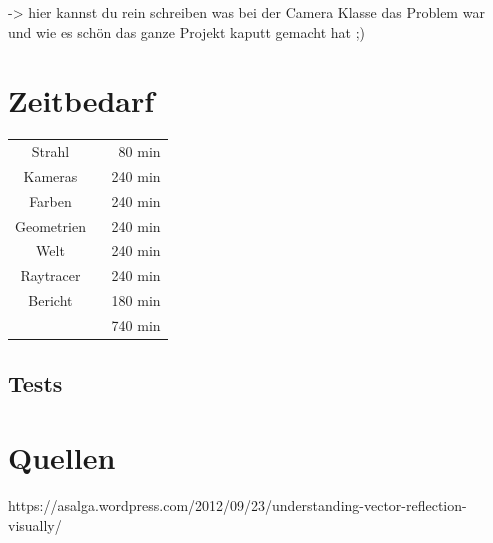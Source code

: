 \documentclass[14pt]{extarticle}
\begin{document}
-> hier kannst du rein schreiben was bei der Camera Klasse das Problem war und wie es schön das ganze Projekt kaputt gemacht hat ;) 



\section{Zeitbedarf}
\begin{center}
\begin{tabular}{cr}
Strahl	  \	&80 min	\\
Kameras 	\	&240 min	\\
Farben \	&240 min	\\
Geometrien \	&240 min	\\
Welt \	&240 min	\\
Raytracer \	&240 min	\\

Bericht  \		&180 min	 \\
	\hline
	&740 min
\end{tabular}
\end{center}

\subsection{Tests}

\section{Quellen}
https://asalga.wordpress.com/2012/09/23/understanding-vector-reflection-visually/
\end{document}
